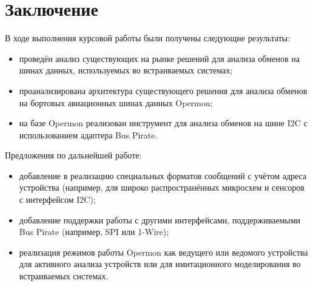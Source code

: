\section{Заключение}

В ходе выполнения курсовой работы были получены следующие результаты:

\begin{itemize}
 \item проведён анализ существующих на рынке решений для анализа обменов на шинах данных, используемых во встраиваемых системах;
 \item проанализирована архитектура существующего решения для анализа обменов на бортовых авиационных шинах данных Opermon;
 \item на базе Opermon реализован инструмент для анализа обменов на шине I2C с использованием адаптера Bus Pirate.
\end{itemize}

Предложения по дальнейшей работе:

\begin{itemize}
 \item добавление в реализацию специальных форматов сообщений с учётом адреса устройства (например, для широко распространённых микросхем и сенсоров с интерфейсом I2C);
 \item добавление поддержки работы с другими интерфейсами, поддерживаемыми Bus Pirate (например, SPI или 1-Wire);
 \item реализация режимов работы Opermon как ведущего или ведомого устройства для активного анализа устройств или для имитационного моделирования во встраиваемых системах.
\end{itemize}

